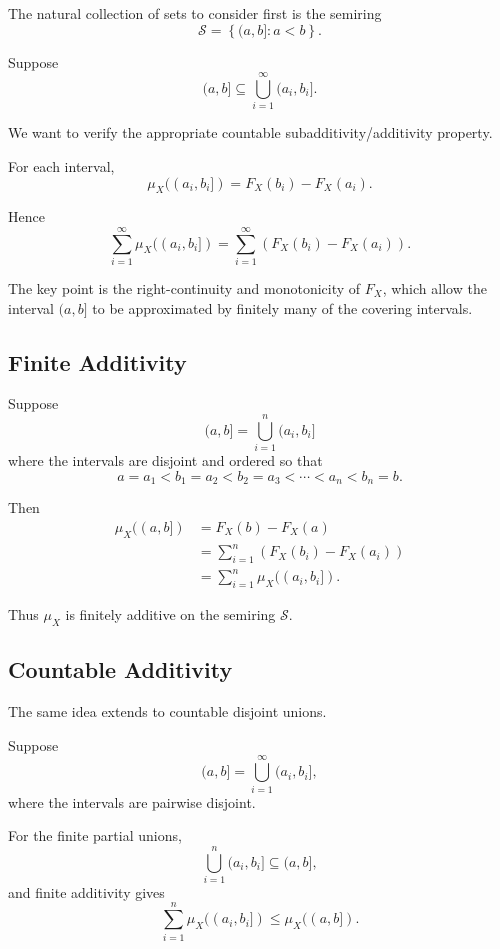 The natural collection of sets to consider first is the semiring
\[
\mathcal{S}
=
\left\{
(a,b]:a<b
\right\}.
\]

Suppose
\[
(a,b]
\subseteq
\bigcup_{i=1}^{\infty}(a_i,b_i].
\]

We want to verify the appropriate countable subadditivity/additivity
property.

For each interval,
\[
\mu_X((a_i,b_i])
=
F_X(b_i)-F_X(a_i).
\]

Hence
\[
\sum_{i=1}^{\infty}
\mu_X((a_i,b_i])
=
\sum_{i=1}^{\infty}
\left(
F_X(b_i)-F_X(a_i)
\right).
\]

The key point is the right-continuity and monotonicity of $F_X$,
which allow the interval $(a,b]$ to be approximated by finitely many
of the covering intervals.

\subsection{Finite Additivity}

Suppose
\[
(a,b]
=
\bigcup_{i=1}^{n}(a_i,b_i]
\]
where the intervals are disjoint and ordered so that
\[
a=a_1<b_1=a_2<b_2=a_3<\cdots<a_n<b_n=b.
\]

Then
\[
\begin{aligned}
\mu_X((a,b])
&=
F_X(b)-F_X(a)\\
&=
\sum_{i=1}^{n}
\left(
F_X(b_i)-F_X(a_i)
\right)\\
&=
\sum_{i=1}^{n}
\mu_X((a_i,b_i]).
\end{aligned}
\]

Thus $\mu_X$ is finitely additive on the semiring $\mathcal{S}$.

\subsection{Countable Additivity}

The same idea extends to countable disjoint unions.

Suppose
\[
(a,b]
=
\bigcup_{i=1}^{\infty}(a_i,b_i],
\]
where the intervals are pairwise disjoint.

For the finite partial unions,
\[
\bigcup_{i=1}^{n}(a_i,b_i]
\subseteq
(a,b],
\]
and finite additivity gives
\[
\sum_{i=1}^{n}
\mu_X((a_i,b_i])
\leq
\mu_X((a,b]).
\]

